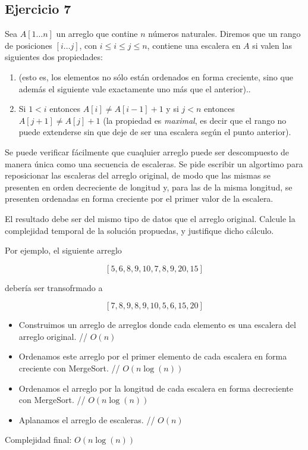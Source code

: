 \subsection{Ejercicio 7}
Sea $A[1\ldots n]$ un arreglo que contine $n$ números naturales. Diremos que un rango de posiciones $[i\ldots j]$, con $i \leq i \leq j \leq n$, contiene una escalera en $A$ si valen las siguientes dos propiedades:
\begin{enumerate}
    \item {} (esto es, los elementos no sólo están ordenados en forma creciente, sino que además el siguiente vale exactamente uno más que el anterior)..
    \item Si $1 < i$ entonces $A[i] \neq A[i - 1] + 1$ y si $j < n$ entonces $A[j + 1] \neq A[j] + 1$ (la propiedad es \textit{maximal}, es decir que el rango no puede extenderse sin que deje de ser una escalera según el punto anterior).
\end{enumerate}

Se puede verificar fácilmente que cuaqluier arreglo puede ser descompuesto de manera única como una secuencia de escaleras. Se pide escribir un algortimo para reposicionar las escaleras del arreglo original, de modo que las mismas se presenten en orden decreciente de longitud y, para las de la misma longitud, se presenten ordenadas en forma creciente por el primer valor de la escalera.

El resultado debe ser del mismo tipo de datos que el arreglo original. Calcule la complejidad temporal de la solución propuedas, y justifique dicho cálculo.

Por ejemplo, el siguiente arreglo

    {\large\[[5,6,8,9,10,7,8,9,20,15]\]}

debería ser transofrmado a

    {\large\[[7,8,9,8,9,10,5,6,15,20]\]}

\pagebreak

\begin{itemize}
    \item Construimos un arreglo de arreglos donde cada elemento es una escalera del arreglo original. // $O(n)$
    \item Ordenamos este arreglo por el primer elemento de cada escalera en forma creciente con MergeSort. // $O(n\log(n))$
    \item Ordenamos el arreglo por la longitud de cada escalera en forma decreciente con MergeSort. // $O(n\log(n))$
    \item Aplanamos el arreglo de escaleras. // $O(n)$
\end{itemize}
Complejidad final: $O(n\log(n))$

